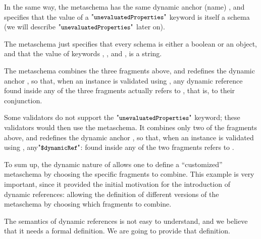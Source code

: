 In the same way, the metaschema  has the same dynamic anchor (name) , and specifies that
the value of a $\qunProps$ keyword is itself a schema (we will describe $\qunProps$ later on).

The metaschema  just specifies that every schema is either a boolean or an object,
and that the value of keywords {\qdid}, {\qdda}, and {\qtitle}, 
is a string.

The metaschema  combines the three fragments above, and redefines the dynamic anchor ,
so that, when an instance is validated using , any dynamic reference 
 found inside any of the three fragments actually refers to ,
that is, to their conjunction.



Some validators do not support the $\qunProps$ keyword; these validators would then use the
 metaschema.
It combines only two of the fragments above, and redefines the dynamic anchor ,
so that, when an instance is validated using , any$\qddref$: 
 found inside any of the two fragments refers to .

To sum up, the dynamic nature of  allows one to define a ``customized'' metaschema by choosing the specific fragments to
combine. 
This example is very important, since it provided the initial motivation for the introduction of dynamic references:
allowing the definition of different versions of the metaschema by choosing which fragments to combine.




The semantics of dynamic references is not easy to understand, and we believe that it needs a formal definition.
We are going to provide that definition. %


